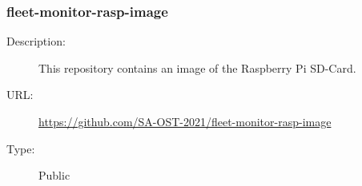 \subsubsection{fleet-monitor-rasp-image} \vspace{-0.2cm}
\begin{description}
  \item[Description:] This repository contains an image of the Raspberry Pi SD-Card.\vspace{-0.25cm}
  \item[URL:] \url{https://github.com/SA-OST-2021/fleet-monitor-rasp-image}\vspace{-0.25cm}
  \item[Type:] Public\vspace{-0.25cm}
\end{description}
